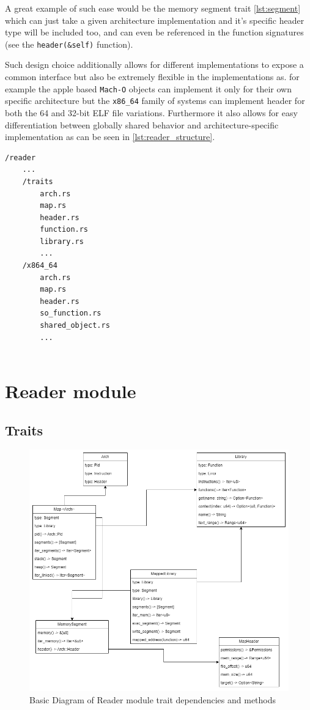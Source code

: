 A great example of such ease would be the memory segment trait \ref{lst:segment} which can just take a given architecture implementation and it's specific header type will be included too, and can even be referenced in the function signatures (see the \verb|header(&self)| function).

Such design choice additionally allows for different implementations to expose a common interface but also be extremely flexible in the implementations as. for example the apple based \verb|Mach-O| objects can implement it only for their own specific architecture but the \verb|x86_64| family of systems can implement header for both the 64 and 32-bit ELF file variations. Furthermore it also allows for easy differentiation between globally shared behavior and architecture-specific implementation as can be seen in \ref{lst:reader_structure}.

\begin{lstlisting}[caption=\label{lst:reader_structure}"Structure of the reader module outlining separate trait and implementation folder"]
/reader
    ...
    /traits
        arch.rs
        map.rs
        header.rs
        function.rs
        library.rs
        ...
    /x864_64
        arch.rs
        map.rs
        header.rs
        so_function.rs
        shared_object.rs
        ...
        
\end{lstlisting}

\section{Reader module}
\label{reader}

\subsection{Traits}

\begin{figure}
    \centering
    \includegraphics[width=0.65\linewidth]{reader_traits.drawio.png}
    \caption{Basic Diagram of Reader module trait dependencies and methods}
    \label{fig:reader-traits}
\end{figure}

